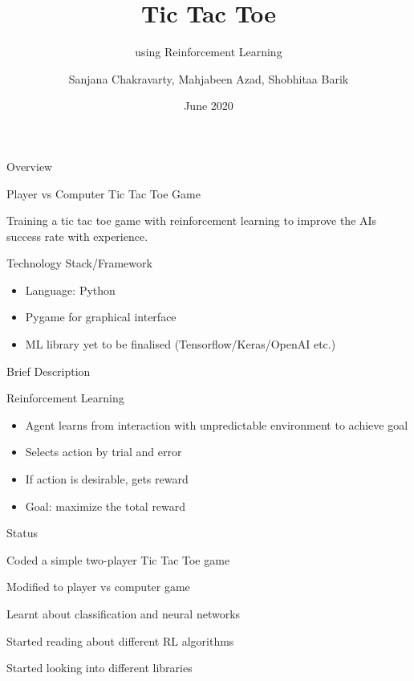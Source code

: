 \documentclass[14pt]{beamer}
\title[WTEF 2020]{Tic Tac Toe}
\subtitle{using Reinforcement Learning}
\author[Group 12]{Sanjana Chakravarty, Mahjabeen Azad, Shobhitaa Barik}
\date{June 2020}
\begin{document}
\begin{frame}
    \titlepage
\end{frame}

\begin{frame}{Overview}
    \begin{center}
        \textcolor{myAmber}{Player vs Computer Tic Tac Toe Game}
    \end{center}
   
    \begin{center}
    Training a tic tac toe game with reinforcement learning to improve the AI\textquotesingle s success rate with experience.
    \end{center}
\end{frame}

\begin{frame}{Technology Stack/Framework}
        \begin{itemize}
            \item Language: Python
            \item Pygame for graphical interface 
            \item ML library yet to be finalised (Tensorflow/Keras/OpenAI etc.)
        \end{itemize}
\end{frame}

\begin{frame}{Brief Description}
    \begin{block}{Reinforcement Learning}        
        \begin{itemize}
            \item<1-> Agent learns from interaction with unpredictable environment to achieve goal
            \item<2-> Selects action by trial and error
            \item<3-> If action is desirable, gets reward
            \item<4-> Goal: maximize the total reward
        \end{itemize}
    \end{block}
\end{frame}

\begin{frame}{Status}
    \begin{description}[STATUS]
        \item[\color{myPink}{24 June}] Coded a simple two-player Tic Tac Toe game
        \item[\color{myPink}{27 June}] Modified to player vs computer game
        \item[\color{myPink}{28 June}] Learnt about classification and neural networks
        \item[\color{myPink}{29 June}] Started reading about different RL algorithms
        \item[\color{myPink}{04 July}] Started looking into different libraries
    \end{description}
\end{frame}
\end{document}
